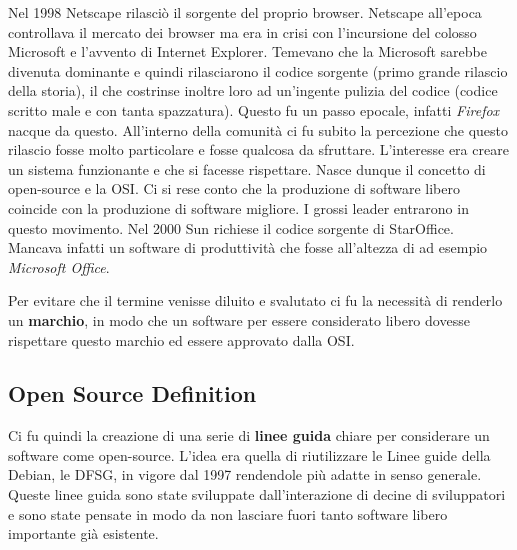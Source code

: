 Nel 1998 Netscape rilasciò il sorgente del proprio browser. Netscape all'epoca controllava il mercato dei browser ma era in crisi con l'incursione del colosso Microsoft e l'avvento di Internet Explorer. Temevano che la Microsoft sarebbe divenuta dominante e quindi rilasciarono il codice sorgente (primo grande rilascio della storia), il che costrinse inoltre loro ad un'ingente pulizia del codice (codice scritto male e con tanta spazzatura). Questo fu un passo epocale, infatti \textit{Firefox} nacque da questo. All'interno della comunità ci fu subito la percezione che questo rilascio fosse molto particolare e fosse qualcosa da sfruttare. L'interesse era creare un sistema funzionante e che si facesse rispettare. Nasce dunque il concetto di open-source e la OSI. Ci si rese conto che la produzione di software libero coincide con la produzione di software migliore. I grossi leader entrarono in questo movimento. Nel 2000 Sun richiese il codice sorgente di StarOffice. Mancava infatti un software di produttività che fosse all'altezza di ad esempio \textit{Microsoft Office}.

Per evitare che il termine venisse diluito e svalutato ci fu la necessità di renderlo un \textbf{marchio}, in modo che un software per essere considerato libero dovesse rispettare questo marchio ed essere approvato dalla OSI. 

\subsection{Open Source Definition}

Ci fu quindi la creazione di una serie di \textbf{linee guida} chiare per considerare un software come open-source. L'idea era quella di riutilizzare le Linee guide della Debian, le DFSG, in vigore dal 1997 rendendole più adatte in senso generale. Queste linee guida sono state sviluppate dall'interazione di decine di sviluppatori e sono state pensate in modo da non lasciare fuori tanto software libero importante già esistente.


